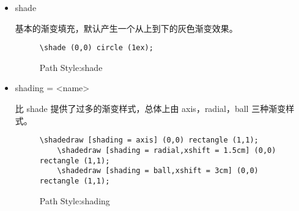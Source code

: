 \begin{itemize}
    \item shade 
    
    基本的渐变填充，默认产生一个从上到下的灰色渐变效果。
    \begin{figure}[H]
        \centering
        \begin{minipage}{0.35\linewidth}
            \centering
        \end{minipage}
        \begin{minipage}{0.55\linewidth}
            \begin{lstlisting}[style = latex-side]
    \shade (0,0) circle (1ex);
            \end{lstlisting}
        \end{minipage}
        \caption{Path Style:shade}
    \end{figure}

    \item shading = <name>
    
    比 shade 提供了过多的渐变样式，总体上由 axis，radial，ball 三种渐变样式。

    \begin{figure}[H]
        \centering
        \begin{minipage}{0.35\linewidth}
            \centering
        \end{minipage}
        \begin{minipage}{0.55\linewidth}
            \begin{lstlisting}[style = latex-side]
    \shadedraw [shading = axis] (0,0) rectangle (1,1);
    \shadedraw [shading = radial,xshift = 1.5cm] (0,0) rectangle (1,1);
    \shadedraw [shading = ball,xshift = 3cm] (0,0) rectangle (1,1);
            \end{lstlisting}
        \end{minipage}
        \caption{Path Style:shading}
    \end{figure}
\end{itemize}

